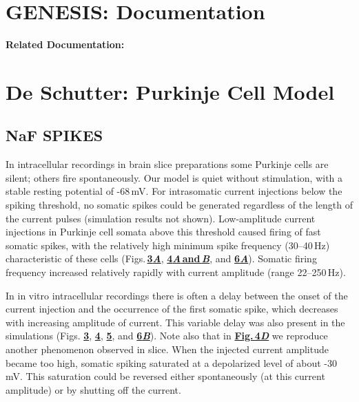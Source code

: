 \documentclass[12pt]{article}
\begin{document}
\section*{GENESIS: Documentation}

{\bf Related Documentation:}

\section*{De Schutter: Purkinje Cell Model}

\subsection*{NaF SPIKES}

In intracellular recordings in brain slice preparations
some Purkinje cells are silent; others fire spontaneously.
Our model is quiet without stimulation, with a stable
resting potential of -68\,mV. For intrasomatic current injections
below the spiking threshold, no somatic spikes
could be generated regardless of the length of the current
pulses (simulation results not shown). Low-amplitude
current injections in Purkinje cell somata above this threshold
caused firing of fast somatic spikes, with the relatively
high minimum spike frequency (30--40\,Hz) characteristic
of these cells (Figs.\,\href{../pub-purkinje-deschutter1-fig-3/pub-purkinje-deschutter1-fig-3.tex}{\bf 3{\it A}}, \href{../pub-purkinje-deschutter1-fig-4/pub-purkinje-deschutter1-fig-4.tex}{\bf 4{\it A}\,and\,{\it B}}, and \href{../pub-purkinje-deschutter1-fig-6/pub-purkinje-deschutter1-fig-6.tex}{\bf 6{\it A}}). Somatic firing
frequency increased relatively rapidly with current amplitude
(range 22--250\,Hz).

In in vitro intracellular recordings there is often a delay
between the onset of the current injection and the occurrence
of the first somatic spike, which decreases with increasing
amplitude of current. This variable delay was also
present in the simulations (Figs. \href{../pub-purkinje-deschutter1-fig-3/pub-purkinje-deschutter1-fig-3.tex}{\bf 3}, \href{pub-purkinje-deschutter1-fig-4/pub-purkinje-deschutter1-fig-4.tex}{\bf 4}, \href{pub-purkinje-deschutter1-fig-5/pub-purkinje-deschutter1-fig-5.tex}{\bf 5}, and \href{pub-purkinje-deschutter1-fig-6/pub-purkinje-deschutter1-fig-6.tex}{\bf 6{\it B}}). Note also
that in \href{../pub-purkinje-deschutter1-fig-4/pub-purkinje-deschutter1-fig-4.tex}{\bf Fig.\,4{\it D}} we reproduce another phenomenon observed
in slice. When the injected current amplitude became
too high, somatic spiking saturated at a depolarized
level of about -30\,mV. This saturation could be reversed
either spontaneously (at this current amplitude) or by shutting
off the current.
\end{document}
